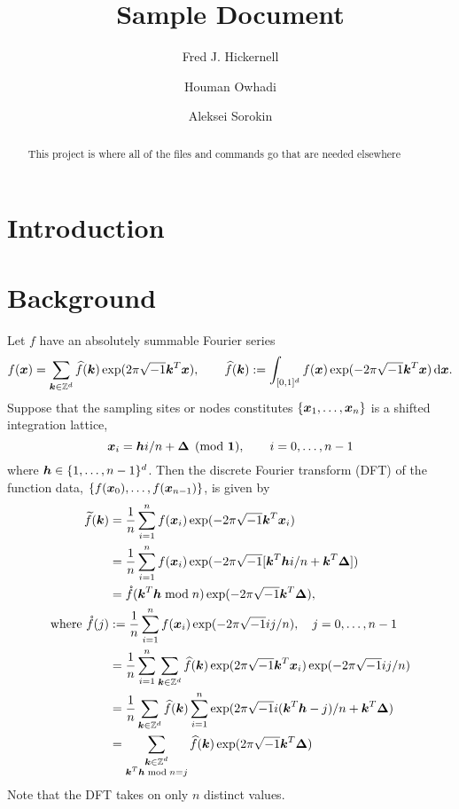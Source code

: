 \documentclass{amsart}
\begin{document}
\title{Sample Document}
\author{Fred J. Hickernell}
\author{Houman Owhadi}
\author{Aleksei Sorokin}
\begin{abstract}This project is where all of the files and commands go that are needed elsewhere
\end{abstract}

\maketitle

\section{Introduction}

\section{Background}
Let $f$ have an absolutely summable Fourier series
\begin{equation*}
    f(\boldsymbol{x}) = \sum_{\boldsymbol{k} \in \mathbb{Z}^d} \widehat{f}(\boldsymbol{k}) \exp(2 \pi \sqrt{-1} \boldsymbol{k}^T \boldsymbol{x}), \qquad \widehat{f}(\boldsymbol{k}) : = \int_{[0,1]^d} f(\boldsymbol{x})  \exp(-2 \pi \sqrt{-1} \boldsymbol{k}^T \boldsymbol{x}) \, {\rm d} \boldsymbol{x}.
\end{equation*}
Suppose that the sampling sites or nodes constitutes $\{ \boldsymbol{x}_1, \ldots, \boldsymbol{x}_n\}$ is a shifted integration lattice, 
\begin{equation} \label{eq:shift_lat}
    \boldsymbol{x}_i = \boldsymbol{h} i /n + \boldsymbol{\Delta} \pmod {\boldsymbol{1}}, \qquad i = 0, \ldots, n - 1
\end{equation}
where $\boldsymbol{h} \in \{1, \ldots, n-1\}^d$.  Then the discrete Fourier transform (DFT) of the function data, $\{ f(\boldsymbol{x}_0), \ldots, f(\boldsymbol{x}_{n-1})\}$, is given by 
\begin{align*}
    \widetilde{f}(\boldsymbol{k}) &= \frac 1n \sum_{i=1}^n f(\boldsymbol{x}_i) \exp(-2 \pi \sqrt{-1} \boldsymbol{k}^T \boldsymbol{x}_i) \\
    & = \frac 1n \sum_{i=1}^n f(\boldsymbol{x}_i) \exp(-2 \pi \sqrt{-1} [\boldsymbol{k}^T\boldsymbol{h} i/n + \boldsymbol{k}^T\boldsymbol{\Delta}]) \\
    & = \mathring{f}(\boldsymbol{k}^T \boldsymbol{h} \bmod n) \exp(-2 \pi \sqrt{-1} \boldsymbol{k}^T\boldsymbol{\Delta}), \\
    \text{where } 
    \mathring{f}(j) &: = \frac 1n \sum_{i=1}^n f(\boldsymbol{x}_i) \exp(-2 \pi \sqrt{-1} ij/n), \quad  j = 0, \ldots, n-1 \\
    & = \frac 1n \sum_{i=1}^n \sum_{\boldsymbol{k} \in \mathbb{Z}^d} \widehat{f}(\boldsymbol{k}) \exp(2 \pi \sqrt{-1} \boldsymbol{k}^T \boldsymbol{x}_i) \exp(-2 \pi \sqrt{-1} ij/n) \\
    & = \frac 1n \sum_{\boldsymbol{k} \in \mathbb{Z}^d} \widehat{f}(\boldsymbol{k}) \sum_{i=1}^n \exp(2 \pi \sqrt{-1} i (\boldsymbol{k}^T \boldsymbol{h} - j) /n + \boldsymbol{k}^T \boldsymbol{\Delta}) \\
    & = \sum_{\substack{\boldsymbol{k} \in \mathbb{Z}^d \\ \boldsymbol{k}^T \boldsymbol{h} \bmod n = j}} \widehat{f}(\boldsymbol{k}) \exp(2 \pi \sqrt{-1} \boldsymbol{k}^T \boldsymbol{\Delta}) \\
\end{align*}
Note that the DFT takes on only $n$ distinct values. 
\end{document}
